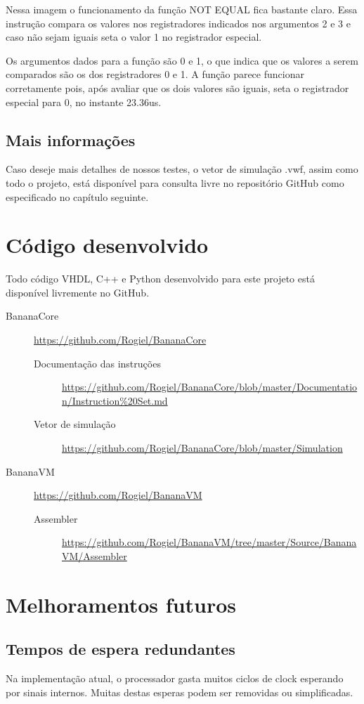 \documentclass[11pt]{report}
\begin{document}
Nessa imagem o funcionamento da função NOT EQUAL fica bastante claro. Essa instrução compara os valores nos registradores indicados nos argumentos 2 e 3 e caso não sejam iguais seta o valor 1 no registrador especial.

Os argumentos dados para a função são 0 e 1, o que indica que os valores a serem comparados são os dos registradores 0 e 1. A função parece funcionar corretamente pois, após avaliar que os dois valores são iguais, seta o registrador especial para 0, no instante 23.36us.
\section*{Mais informações}
Caso deseje mais detalhes de nossos testes, o vetor de simulação .vwf, assim como todo o projeto, está disponível para consulta livre no repositório GitHub como especificado no capítulo seguinte.


\chapter{Código desenvolvido}
\label{ch:Instruction documentation}
Todo código VHDL, C++ e Python desenvolvido para este projeto está disponível livremente no GitHub.

\begin{description}
	\item[BananaCore] \url{https://github.com/Rogiel/BananaCore}
	\begin{description}
		\item[Documentação das instruções] \url{https://github.com/Rogiel/BananaCore/blob/master/Documentation/Instruction%20Set.md}
		\item[Vetor de simulação] \url{https://github.com/Rogiel/BananaCore/blob/master/Simulation}
	\end{description}
	
	\item[BananaVM] \url{https://github.com/Rogiel/BananaVM}
	\begin{description}
		\item[Assembler] \url{https://github.com/Rogiel/BananaVM/tree/master/Source/BananaVM/Assembler}
	\end{description}
\end{description}

\chapter{Melhoramentos futuros}
\section*{Tempos de espera redundantes}
Na implementação atual, o processador gasta muitos ciclos de clock esperando por sinais internos. Muitas destas esperas podem ser removidas ou simplificadas.
\end{document}
